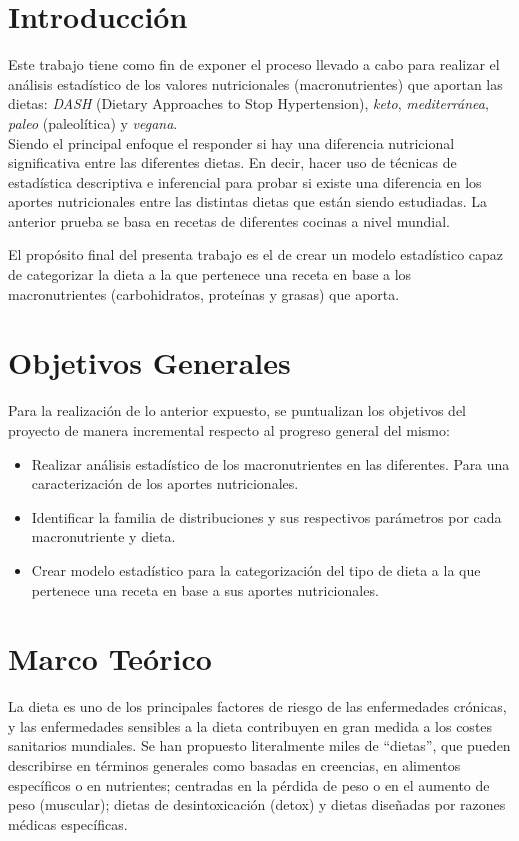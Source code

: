 \documentclass[12pt,a4paper]{article}
\begin{document}
\newpage

\tableofcontents

\newpage

\section{Introducción}
Este trabajo tiene como fin de exponer el proceso llevado a cabo para 
realizar el análisis estadístico de los valores nutricionales (macronutrientes) 
que aportan las dietas: \emph{DASH} (Dietary Approaches to Stop Hypertension), 
\emph{keto}, \emph{mediterránea}, \emph{paleo} (paleolítica) y \emph{vegana}.\\

Siendo el principal enfoque el responder si hay una diferencia nutricional 
significativa entre las diferentes dietas. En decir, hacer uso de 
técnicas de estadística descriptiva e inferencial para probar si existe 
una diferencia en los aportes nutricionales entre las distintas dietas que 
están siendo estudiadas. La anterior prueba se basa en recetas de diferentes 
cocinas a nivel mundial.

El propósito final del presenta trabajo es el de crear un modelo estadístico 
capaz de categorizar la dieta a la que pertenece una receta en base a los 
macronutrientes (carbohidratos, proteínas y grasas) que aporta.

\section{Objetivos Generales}
Para la realización de lo anterior expuesto, se puntualizan los objetivos del 
proyecto de manera incremental respecto al progreso general del mismo:
\begin{itemize}
    \item Realizar análisis estadístico de los macronutrientes en las diferentes. 
    Para una caracterización de los aportes nutricionales.
    \item Identificar la familia de distribuciones y sus respectivos parámetros 
    por cada macronutriente y dieta.
    \item Crear modelo estadístico para la categorización del tipo de dieta a 
    la que pertenece una receta en base a sus aportes nutricionales.
\end{itemize}

\newpage

\section{Marco Teórico}
La dieta es uno de los principales factores de riesgo de las enfermedades 
crónicas, y las enfermedades sensibles a la dieta contribuyen en gran medida 
a los costes sanitarios mundiales. Se han propuesto literalmente miles de 
``dietas'', que pueden describirse en términos generales como basadas en 
creencias, en alimentos específicos o en nutrientes; centradas en la 
pérdida de peso o en el aumento de peso (muscular); dietas de desintoxicación 
(detox) y dietas diseñadas por razones médicas específicas.\cite{marvastipopular} \\
\end{document}
